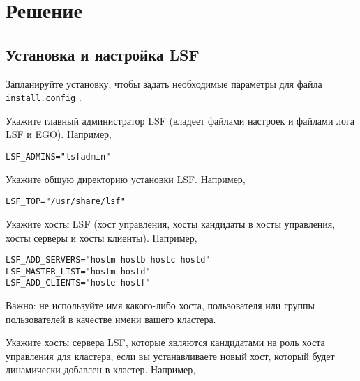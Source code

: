 \section{Решение} 


\subsection{Установка и настройка LSF}


Запланируйте установку, чтобы задать необходимые параметры для файла \lstinline{install.config} \cite{install_plan}.

Укажите главный администратор LSF (владеет файлами настроек и файлами лога LSF и EGO). Например,

\begin{lstlisting}
LSF_ADMINS="lsfadmin"
\end{lstlisting}

Укажите общую директорию установки LSF. Например,

\begin{lstlisting}
LSF_TOP="/usr/share/lsf"
\end{lstlisting}

Укажите хосты LSF (хост управления, хосты кандидаты в хосты управления, хосты серверы и хосты клиенты). Например,

\begin{lstlisting}
LSF_ADD_SERVERS="hostm hostb hostc hostd"
LSF_MASTER_LIST="hostm hostd"
LSF_ADD_CLIENTS="hoste hostf"
\end{lstlisting}

Важно: не используйте имя какого-либо хоста, пользователя или группы пользователей в качестве имени вашего кластера.

Укажите хосты сервера LSF, которые являются кандидатами на роль хоста управления для кластера, если вы устанавливаете новый хост, который будет динамически добавлен в кластер. Например,

